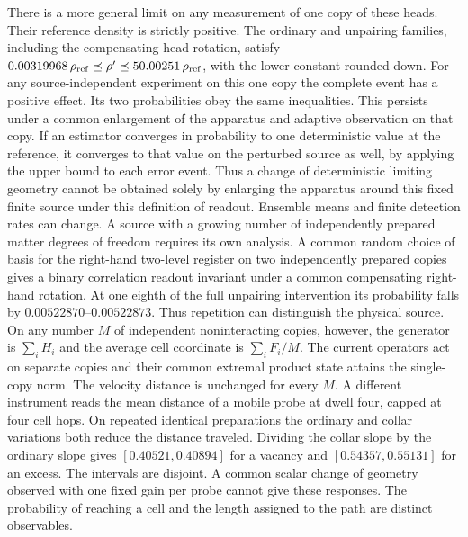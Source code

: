 \documentclass[11pt]{article}
\begin{document}
There is a more general limit on any measurement of one copy of these
heads. Their reference density is strictly positive. The ordinary
and unpairing families, including the compensating head rotation,
satisfy \(0.00319968\,\rho_{\rm ref}\preceq\rho'
\preceq50.00251\,\rho_{\rm ref}\), with the lower constant rounded
down. For any source-independent experiment on this one copy the
complete event has a positive effect. Its two probabilities obey the
same inequalities. This persists under a common enlargement of the
apparatus and adaptive observation on that copy. If an estimator
converges in probability to one deterministic value at the reference,
it converges to that value on the perturbed source as well, by applying
the upper bound to each error event. Thus a change of deterministic
limiting geometry cannot be obtained solely by enlarging the apparatus
around this fixed finite source under this definition of readout.
Ensemble means and finite detection rates can change. A source with a
growing number of independently prepared matter degrees of freedom
requires its own analysis. A common random choice of basis for the right-hand two-level
register on two independently prepared copies gives a binary correlation
readout invariant under a common compensating right-hand rotation.
At one eighth of the full unpairing intervention its probability
falls by \(0.00522870\)--\(0.00522873\). Thus repetition can
distinguish the physical source. On any number \(M\) of independent
noninteracting copies, however, the generator is \(\sum_i H_i\)
and the average cell coordinate is \(\sum_i F_i/M\).
The current operators act on separate copies and their common extremal
product state attains the single-copy norm. The velocity distance is
unchanged for every \(M\). A different instrument reads the mean distance of a
mobile probe at dwell four, capped at four cell hops. On repeated
identical preparations the ordinary and collar variations both
reduce the distance traveled. Dividing the collar slope by the
ordinary slope gives \([0.40521,0.40894]\) for a vacancy and
\([0.54357,0.55131]\) for an excess. The intervals are disjoint.
A common scalar change of geometry observed with one fixed gain
per probe cannot give these responses. The probability of reaching
a cell and the length assigned to the path are distinct observables.
\end{document}
